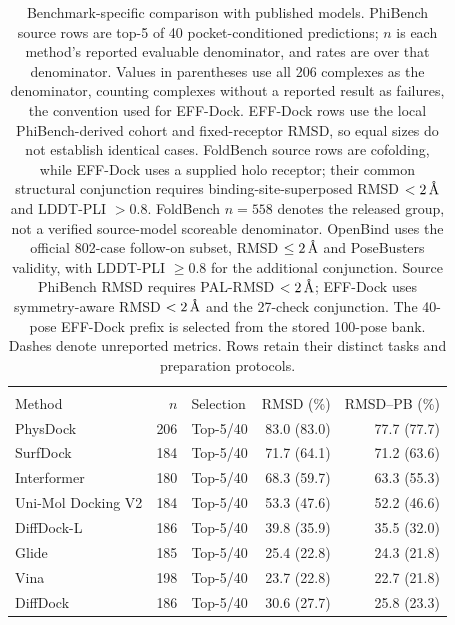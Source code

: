 \documentclass{article}
\newcommand{\angstrom}{\text{\normalfont\AA}}
\begin{document}
\begin{table}[p]
    \centering
    \small
    \caption{Benchmark-specific comparison with published models. PhiBench source rows are top-5 of 40 pocket-conditioned predictions; $n$ is each method's reported evaluable denominator, and rates are over that denominator. Values in parentheses use all 206 complexes as the denominator, counting complexes without a reported result as failures, the convention used for EFF-Dock. EFF-Dock rows use the local PhiBench-derived cohort and fixed-receptor RMSD, so equal sizes do not establish identical cases. FoldBench source rows are cofolding, while EFF-Dock uses a supplied holo receptor; their common structural conjunction requires binding-site-superposed RMSD $<2\,\angstrom$ and LDDT-PLI $>0.8$. FoldBench $n=558$ denotes the released group, not a verified source-model scoreable denominator. OpenBind uses the official 802-case follow-on subset, RMSD $\le2\,\angstrom$ and PoseBusters validity, with LDDT-PLI $\ge0.8$ for the additional conjunction. Source PhiBench RMSD requires PAL-RMSD $<2\,\angstrom$; EFF-Dock uses symmetry-aware RMSD $<2\,\angstrom$ and the 27-check conjunction. The 40-pose EFF-Dock prefix is selected from the stored 100-pose bank. Dashes denote unreported metrics. Rows retain their distinct tasks and preparation protocols.}
    \label{tab:si_literature_context}
    \begin{tabularx}{\textwidth}{@{}>{\raggedright\arraybackslash}X r >{\raggedright\arraybackslash}p{} rr@{}}
        \toprule
        \multicolumn{5}{@{}l}{\textbf{PhiBench: pocket-conditioned source results and local redocking}} \\
        Method & $n$ & Selection & RMSD (\%) & RMSD--PB (\%) \\
        \midrule
        PhysDock & 206 & Top-5/40 & 83.0 (83.0) & 77.7 (77.7) \\
        SurfDock & 184 & Top-5/40 & 71.7 (64.1) & 71.2 (63.6) \\
        Interformer & 180 & Top-5/40 & 68.3 (59.7) & 63.3 (55.3) \\
        Uni-Mol Docking V2 & 184 & Top-5/40 & 53.3 (47.6) & 52.2 (46.6) \\
        DiffDock-L & 186 & Top-5/40 & 39.8 (35.9) & 35.5 (32.0) \\
        Glide & 185 & Top-5/40 & 25.4 (22.8) & 24.3 (21.8) \\
        Vina & 198 & Top-5/40 & 23.7 (22.8) & 22.7 (21.8) \\
        DiffDock & 186 & Top-5/40 & 30.6 (27.7) & 25.8 (23.3) \\

\end{tabularx}
\end{table}
\end{document}

